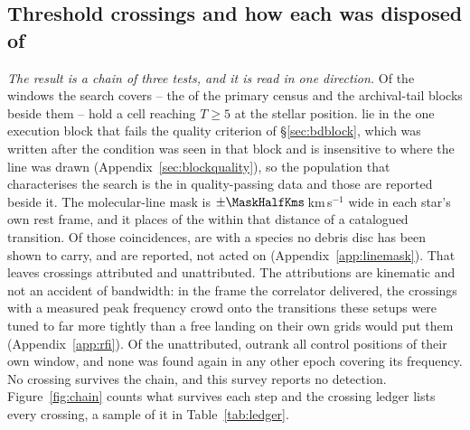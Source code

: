 \subsection{Threshold crossings and how each was disposed of}
\label{sec:technosearch}

\emph{The result is a chain of three tests, and it is read in one direction.}
Of the windows the search covers -- the \NWindows{} of the primary census
and the archival-tail blocks beside them -- \EvNCrossRaw{} hold a cell
reaching $T\geq5$ at the stellar position. \EvNCrossFlag{} lie in the one
execution block that fails the quality criterion of \S\ref{sec:bdblock}, which
was written after the condition was seen in that block and is insensitive to
where the line was drawn (Appendix~\ref{sec:blockquality}), so the population
that characterises the search is the \EvNCrossQp{} in quality-passing data and
those \EvNCrossFlag{} are reported beside it. The molecular-line mask is $\pm\MaskHalfKms$\,km\,s$^{-1}$ wide in each
star's own rest frame, and it places \MkNCoinc{} of the \EvNCrossQp{} within
that distance of a catalogued transition. Of those coincidences, \MkNSODecideWord{} are with a species no debris disc
has been shown to carry, and are reported, not acted on
(Appendix~\ref{app:linemask}). That leaves
\EvNAttrQp{} crossings attributed and \EvNUnattrQp{} unattributed. The attributions are kinematic and not an accident of bandwidth: in the
frame the correlator delivered, the crossings with a measured peak frequency
crowd onto the transitions these setups were tuned to far more tightly than a
free landing on their own grids would put them (Appendix~\ref{app:rfi}). Of the unattributed,
\EvNRankQp{} outrank all \NCtrl{} control positions of their own window, and
none was found again in any other epoch covering its frequency. No
crossing survives the chain, and this survey reports no detection.
Figure~\ref{fig:chain} counts what survives each step and the crossing
ledger lists every crossing, a sample of it in Table~\ref{tab:ledger}.

